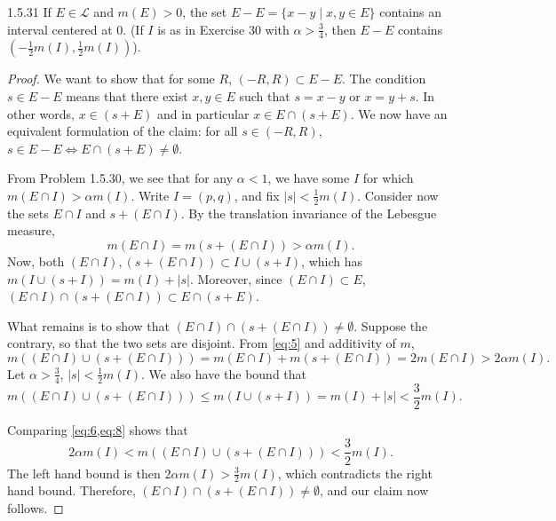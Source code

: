 \documentclass[11pt]{article}
\begin{document}
\begin{problem}{1.5.31}
  If \( E \in \mathcal{L} \) and \( m(E) > 0 \), the set \( E - E = \{x - y \mid x,y \in E\} \) contains an interval centered at \( 0 \).
  (If \( I \) is as in Exercise 30 with \(\alpha > \frac{3}{4}\), then \( E - E \) contains \( (-\frac{1}{2}m(I), \frac{1}{2}m(I)) \)).
\end{problem}
\begin{proof}
  We want to show that for some \(R\), \( (-R, R) \subset E - E \).
  The condition \(s \in E - E\) means that there exist \( x, y \in E \) such that \(s = x - y \) or \( x = y + s \).
  In other words, \( x \in (s + E) \) and in particular \( x \in E \cap (s + E) \).
  We now have an equivalent formulation of the claim: for all \( s \in (-R, R) \), \( s \in E - E \iff E \cap (s + E) \neq \emptyset \).

  From Problem 1.5.30, we see that for any \(\alpha < 1\), we have some \( I \) for which \( m(E \cap I) > \alpha m(I) \).
  Write \( I = (p, q) \), and fix \( |s| < \frac{1}{2}m(I) \).
  Consider now the sets \( E \cap I \) and \( s + (E \cap I) \).
  By the translation invariance of the Lebesgue measure,
  \begin{equation}
  \label{eq:5}
  m(E \cap I) = m(s + (E \cap I)) > \alpha m(I).
\end{equation}
Now, both \( (E \cap I), (s + (E \cap I)) \subset I \cup (s + I) \), which has \( m(I \cup (s + I)) = m(I) + |s| \).
Moreover, since \( (E \cap I) \subset E \), \( (E \cap I) \cap (s + (E \cap I)) \subset E \cap (s + E) \).

What remains is to show that \( (E \cap I) \cap (s + (E \cap I)) \neq \emptyset \).
Suppose the contrary, so that the two sets are disjoint.
From \cref{eq:5} and additivity of \( m \),
\begin{equation}
\label{eq:6}
m((E \cap I) \cup (s + (E \cap I))) = m(E \cap I) + m(s + (E \cap I)) = 2m(E \cap I) > 2\alpha m(I).
\end{equation}
Let \( \alpha > \frac{3}{4} \), \( |s| < \frac{1}{2}m(I) \).
We also have the bound that
\begin{equation}
\label{eq:8}
m((E \cap I) \cup (s + (E \cap I))) \leq m(I \cup (s + I)) = m(I) + |s| < \frac{3}{2}m(I).
\end{equation}

Comparing \cref{eq:6,eq:8} shows that
\begin{equation}
\label{eq:9}
2\alpha m(I) < m((E \cap I) \cup (s + (E \cap I))) < \frac{3}{2}m(I).
\end{equation}
The left hand bound is then \( 2\alpha m(I) > \frac{3}{2}m(I) \), which contradicts the right hand bound.
Therefore, \( (E \cap I) \cap (s + (E \cap I)) \neq \emptyset \), and our claim now follows.

\end{proof}
\end{document}
